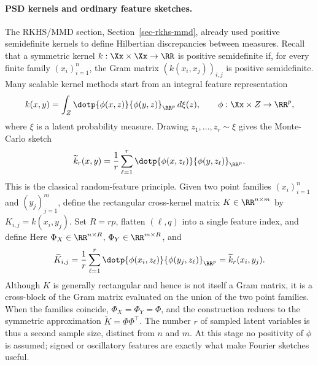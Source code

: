\paragraph{PSD kernels and ordinary feature sketches.}
The RKHS/MMD section, Section~\ref{sec-rkhs-mmd}, already used positive semidefinite kernels to define Hilbertian discrepancies between measures. Recall that a symmetric kernel \(k:\Xx\times\Xx\to\RR\) is positive semidefinite if, for every finite family \((x_i)_{i=1}^n\), the Gram matrix \((k(x_i,x_j))_{i,j}\) is positive semidefinite. Many scalable kernel methods start from an integral feature representation
\[
	k(x,y)=\int_Z \dotp{\phi(x,z)}{\phi(y,z)}_{\RR^p}\,d\xi(z),
	\qquad
	\phi:\Xx\times Z\to\RR^p,
\]
where \(\xi\) is a latent probability measure. Drawing \(z_1,\ldots,z_r\sim\xi\) gives the Monte-Carlo sketch
\[
	\widetilde k_r(x,y)
	=
	\frac1r\sum_{\ell=1}^r
	\dotp{\phi(x,z_\ell)}{\phi(y,z_\ell)}_{\RR^p}.
\]
This is the classical random-feature principle. Given two point families \((x_i)_{i=1}^n\) and \((y_j)_{j=1}^m\), define the rectangular cross-kernel matrix \(K\in\RR^{n\times m}\) by \(K_{i,j}=k(x_i,y_j)\). Set \(R=rp\), flatten \((\ell,q)\) into a single feature index, and define
Here \(\Phi_X\in\RR^{n\times R}\), \(\Phi_Y\in\RR^{m\times R}\), and
\[
	\widetilde K_{i,j}
	=
	\frac1r\sum_{\ell=1}^r
	\dotp{\phi(x_i,z_\ell)}{\phi(y_j,z_\ell)}_{\RR^p}
	=
	\widetilde k_r(x_i,y_j).
\]
Although \(K\) is generally rectangular and hence is not itself a Gram matrix, it is a cross-block of the Gram matrix evaluated on the union of the two point families. When the families coincide, \(\Phi_X=\Phi_Y=\Phi\), and the construction reduces to the symmetric approximation \(\widetilde K=\Phi\Phi^\top\). The number \(r\) of sampled latent variables is thus a second sample size, distinct from \(n\) and \(m\). At this stage no positivity of \(\phi\) is assumed; signed or oscillatory features are exactly what make Fourier sketches useful.


